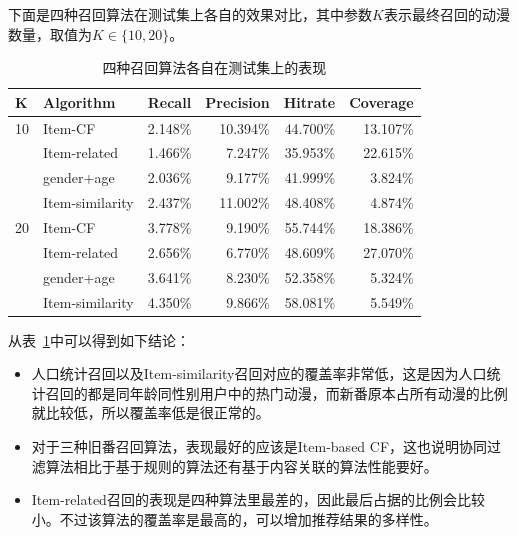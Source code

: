 下面是四种召回算法在测试集上各自的效果对比，其中参数$K$表示最终召回的动漫数量，取值为$K\in\{10,20\}$。
\begin{table}[htbp]
	\centering
	\caption{四种召回算法各自在测试集上的表现}
	\begin{tabular}{rlrrrr}
		\toprule
		\multicolumn{1}{l}{K} & Algorithm & \multicolumn{1}{l}{Recall} & \multicolumn{1}{l}{Precision} & \multicolumn{1}{l}{Hit\;rate} & \multicolumn{1}{l}{Coverage} \\
		\midrule
		10   & Item-CF & 2.148\% & 10.394\% & 44.700\% & 13.107\% \\
		& Item-related & 1.466\% & 7.247\% & 35.953\% & 22.615\% \\
		& gender+age & 2.036\% & 9.177\% & 41.999\% & 3.824\% \\
		& Item-similarity & 2.437\% & 11.002\% & 48.408\% & 4.874\% \\
		20   & Item-CF & 3.778\% & 9.190\% & 55.744\% & 18.386\% \\
		& Item-related & 2.656\% & 6.770\% & 48.609\% & 27.070\% \\
		& gender+age & 3.641\% & 8.230\% & 52.358\% & 5.324\% \\
		& Item-similarity & 4.350\% & 9.866\% & 58.081\% & 5.549\% \\
		\bottomrule
	\end{tabular}%
	\label{tab:recall}%
\end{table}%

从表~\ref{tab:recall}中可以得到如下结论：
\begin{itemize}
	\item 人口统计召回以及Item-similarity召回对应的覆盖率非常低，这是因为人口统计召回的都是同年龄同性别用户中的热门动漫，而新番原本占所有动漫的比例就比较低，所以覆盖率低是很正常的。
	\item 对于三种旧番召回算法，表现最好的应该是Item-based CF，这也说明协同过滤算法相比于基于规则的算法还有基于内容关联的算法性能要好。
	\item Item-related召回的表现是四种算法里最差的，因此最后占据的比例会比较小。不过该算法的覆盖率是最高的，可以增加推荐结果的多样性。
\end{itemize}

